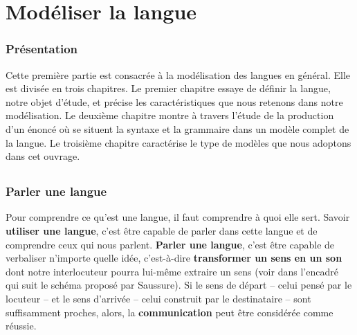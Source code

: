 
\part{Modéliser la langue}

\section*{Présentation}

Cette première partie est consacrée à la modélisation des langues en général. Elle est divisée en trois chapitres. Le premier chapitre essaye de définir la langue, notre objet d’étude, et précise les caractéristiques que nous retenons dans notre modélisation. Le deuxième chapitre montre à travers l’étude de la production d’un énoncé où se situent la syntaxe et la grammaire dans un modèle complet de la langue. Le troisième chapitre caractérise le type de modèles que nous adoptons dans cet ouvrage.

\chapter{}\label{sec:1.1}

\section{Parler une langue}\label{sec:1.1.0}

Pour comprendre ce qu’est une langue, il faut comprendre à quoi elle sert. Savoir \textbf{utiliser une langue}, c’est être capable de parler dans cette langue et de comprendre ceux qui nous parlent. \textbf{Parler une langue}, c’est être capable de verbaliser n’importe quelle idée, c’est-à-dire \textbf{transformer un sens en un son} dont notre interlocuteur pourra lui-même extraire un sens (voir dans l’encadré qui suit le schéma proposé par Saussure). Si le sens de départ – celui pensé par le locuteur – et le sens d’arrivée – celui construit par le destinataire – sont suffisamment proches, alors, la \textbf{communication} peut être considérée comme réussie.

